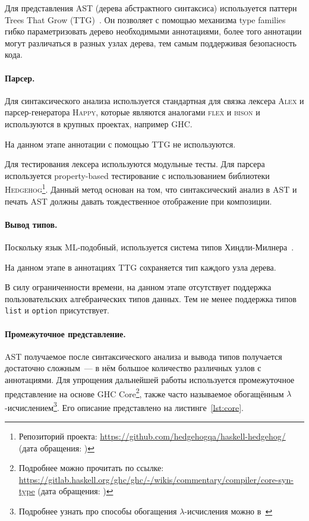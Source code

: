 Для представления AST (дерева абстрактного синтаксиса) используется паттерн Trees That Grow (TTG)~\cite{shayannajdTreesThatGrow}.
Он позволяет с помощью механизма type families~\cite{schrijversTypeCheckingOpen2008} гибко параметризовать дерево необходимыми аннотациями, более того аннотации могут различаться в разных узлах дерева, тем самым поддерживая безопасность кода.

\paragraph{Парсер.}

Для синтаксического анализа используется стандартная для \Haskell{} связка лексера \textsc{Alex} и парсер-генератора \textsc{Happy}, которые являются аналогами \textsc{flex} и \textsc{bison} и используются в крупных проектах, например GHC.

На данном этапе аннотации с помощью TTG не используются.

Для тестирования лексера используются модульные тесты.
Для парсера используется property-based тестирование с использованием библиотеки \textsc{Hedgehog}\footnote{Репозиторий проекта: \url{https://github.com/hedgehogqa/haskell-hedgehog/} (дата обращения: )}.
Данный метод основан на том, что синтаксический анализ в AST и печать AST должны давать тождественное отображение при композиции.

\paragraph{Вывод типов.}

Поскольку язык ML-подобный, используется система типов Хиндли-Милнера~\cite{hindleyPrincipalTypeSchemeObject1969, milnerTheoryTypePolymorphism1978}.

На данном этапе в аннотациях TTG сохраняется тип каждого узла дерева.

В силу ограниченности времени, на данном этапе отсутствует поддержка пользовательских алгебраических типов данных.
Тем не менее поддержка типов \texttt{list} и \texttt{option} присутствует.

\paragraph{Промежуточное представление.}

AST получаемое после синтаксического анализа и вывода типов получается достаточно сложным~--- в нём большое количество различных узлов с аннотациями.
Для упрощения дальнейшей работы используется промежуточное представление на основе GHC Core\footnote{Подробнее можно прочитать по ссылке: \url{https://gitlab.haskell.org/ghc/ghc/-/wikis/commentary/compiler/core-syn-type} (дата обращения: )}, также часто называемое обогащённым $\lambda$-исчислением\footnote{Подробнее узнать про способы обогащения $\lambda$-исчисления можно в~\cite[раздел~3.2]{peytonjones1987the}}.
Его описание представлено на листинге~\ref{lst:core}.

